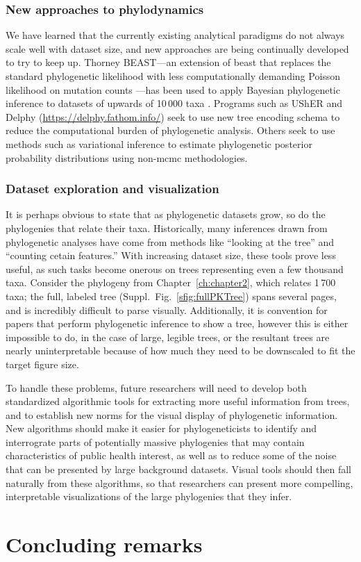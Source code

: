 \subsubsection{New approaches to phylodynamics}
We have learned that the currently existing analytical paradigms do not always scale well with dataset size, and new approaches are being continually developed to try to keep up.
Thorney BEAST---an extension of \gls{beast} that replaces the standard phylogenetic likelihood with less computationally demanding Poisson likelihood on mutation counts \citep{thorne1998estimating}---has been used to apply Bayesian phylogenetic inference to datasets of upwards of 10\,000 taxa \citep{du2021establishment}.
Programs such as UShER \citep{turakhia2021ultrafast} and Delphy (\url{https://delphy.fathom.info/}) seek to use new tree encoding schema to reduce the computational burden of phylogenetic analysis.
Others seek to use methods such as variational inference \cite{zhang2019variational} to estimate phylogenetic posterior probability distributions using non-\gls{mcmc} methodologies.

\subsubsection{Dataset exploration and visualization}
It is perhaps obvious to state that as phylogenetic datasets grow, so do the phylogenies that relate their taxa.
Historically, many inferences drawn from phylogenetic analyses have come from methods like ``looking at the tree'' and ``counting cetain features.''
With increasing dataset size, these tools prove less useful, as such tasks become onerous on trees representing even a few thousand taxa.
Consider the phylogeny from Chapter~\ref{ch:chapter2}, which relates 1\,700 taxa; the full, labeled tree (Suppl.~Fig.~\ref{sfig:fullPKTree}) spans several pages, and is incredibly difficult to parse visually.
Additionally, it is convention for papers that perform phylogenetic inference to show a tree, however this is either impossible to do, in the case of large, legible trees, or the resultant trees are nearly uninterpretable because of how much they need to be downscaled to fit the target figure size.

To handle these problems, future researchers will need to develop both standardized algorithmic tools for extracting more useful information from trees, and to establish new norms for the visual display of phylogenetic information.
New algorithms should make it easier for phylogeneticists to identify and interrograte parts of potentially massive phylogenies that may contain characteristics of public health interest, as well as to reduce some of the noise that can be presented by large background datasets.
Visual tools should then fall naturally from these algorithms, so that researchers can present more compelling, interpretable visualizations of the large phylogenies that they infer.

\section{Concluding remarks}

\cleardoublepage

